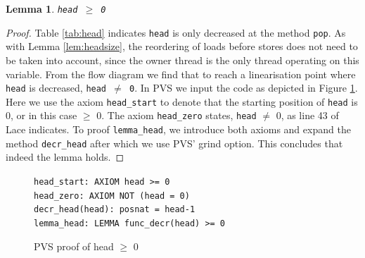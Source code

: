 \documentclass{sig-alternate-br}
\newtheorem{lemma}{Lemma}
\begin{document}
\begin{lemma}
	\texttt{head $\geq$ 0}
	\label{lem:headzero}
\end{lemma}
\begin{proof}
	Table \ref{tab:head} indicates \texttt{head} is only decreased at the method \texttt{pop}.
	As with Lemma \ref{lem:headsize}, the reordering of loads before stores does not need to be taken into account, since the owner thread is the only thread operating on this variable.
	From the flow diagram we find that to reach a linearisation point where \texttt{head} is decreased, \texttt{head $\neq$ 0}.
	In PVS we input the code as depicted in Figure \ref{pvs:headzero}.
	Here we use the axiom \texttt{head\_start} to denote that the starting position of \texttt{head} is 0, or in this case $\geq$ 0.
	The axiom \texttt{head\_zero} states, \texttt{head} $\neq$ 0, as line 43 of Lace indicates.
	To proof \texttt{lemma\_head}, we introduce both axioms and expand the method \texttt{decr\_head} after which we use PVS' grind option.
	This concludes that indeed the lemma holds.
\end{proof}
\begin{figure}[h]
	\texttt{head\_start: AXIOM head >= 0}\\
	\texttt{head\_zero: AXIOM NOT (head = 0)}\\
	\texttt{decr\_head(head): posnat = head-1}\\
	\texttt{lemma\_head: LEMMA func\_decr(head) >= 0}
	\caption{PVS proof of head $\geq$ 0}
	\label{pvs:headzero}
\end{figure}
\end{document}
